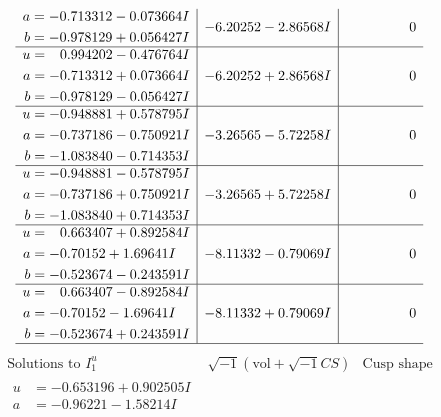 \documentclass[1p]{elsarticle_modified}
\theoremstyle{definition}
\newcommand{\I}{\sqrt{-1}}
\begin{document}
$$\begin{array}{c|c|c}
\begin{aligned}
a &= -0.713312 - 0.073664 I \\
b &= -0.978129 + 0.056427 I\end{aligned}
 & -6.20252 - 2.86568 I & \phantom{-0.000000 } 0 \\ \hline\begin{aligned}
u &= \phantom{-}0.994202 - 0.476764 I \\
a &= -0.713312 + 0.073664 I \\
b &= -0.978129 - 0.056427 I\end{aligned}
 & -6.20252 + 2.86568 I & \phantom{-0.000000 } 0 \\ \hline\begin{aligned}
u &= -0.948881 + 0.578795 I \\
a &= -0.737186 - 0.750921 I \\
b &= -1.083840 - 0.714353 I\end{aligned}
 & -3.26565 - 5.72258 I & \phantom{-0.000000 } 0 \\ \hline\begin{aligned}
u &= -0.948881 - 0.578795 I \\
a &= -0.737186 + 0.750921 I \\
b &= -1.083840 + 0.714353 I\end{aligned}
 & -3.26565 + 5.72258 I & \phantom{-0.000000 } 0 \\ \hline\begin{aligned}
u &= \phantom{-}0.663407 + 0.892584 I \\
a &= -0.70152 + 1.69641 I \\
b &= -0.523674 - 0.243591 I\end{aligned}
 & -8.11332 - 0.79069 I & \phantom{-0.000000 } 0 \\ \hline\begin{aligned}
u &= \phantom{-}0.663407 - 0.892584 I \\
a &= -0.70152 - 1.69641 I \\
b &= -0.523674 + 0.243591 I\end{aligned}
 & -8.11332 + 0.79069 I & \phantom{-0.000000 } 0\\
 \hline 
 \end{array}$$\newpage$$\begin{array}{c|c|c}  
\text{Solutions to }I^u_{1}& \I (\text{vol} + \sqrt{-1}CS) & \text{Cusp shape}\\
 \hline 
\begin{aligned}
u &= -0.653196 + 0.902505 I \\
a &= -0.96221 - 1.58214 I \\

\end{aligned}
\end{array}$$
\end{document}
